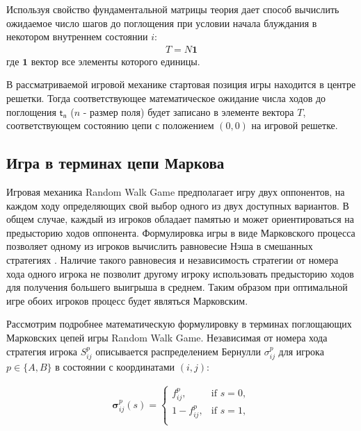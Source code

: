 Используя свойство фундаментальной матрицы теория дает способ вычислить ожидаемое число шагов до поглощения
при условии начала блуждания в некотором внутреннем состоянии $i$:
\begin{equation}
    \begin{aligned}
    T=N\textbf{1}
    \label{eq:T}
    \end{aligned}
\end{equation}
где $\textbf{1}$ вектор все элементы которого единицы.

В рассматриваемой игровой механике стартовая позиция игры находится в центре решетки. 
Тогда соответствующее математическое ожидание числа ходов до поглощения $\boldsymbol{\mathsf{t_n}}$ ($n$ - размер поля) 
будет записано в элементе вектора $T$, соответствующем состоянию цепи с положением $(0, 0)$ на игровой решетке.

\subsection{Игра в терминах цепи Маркова}\label{subsec:ch1/sec3/sub3}

Игровая механика Random Walk Game предполагает игру двух оппонентов, на каждом ходу определяющих свой выбор одного из двух доступных вариантов.
В общем случае, каждый из игроков обладает памятью и может ориентироваться на предысторию ходов оппонента.
Формулировка игры в виде Марковского процесса позволяет одному из игроков вычислить равновесие Нэша в смешанных стратегиях \cite{}.
Наличие такого равновесия и независимость стратегии от номера хода одного игрока не позволит другому игроку использовать предысторию ходов
для получения большего выигрыша в среднем. Таким образом при оптимальной игре обоих игроков процесс будет являться Марковским.

Рассмотрим подробнее математическую формулировку в терминах поглощающих Марковских цепей игры Random Walk Game.
Независимая от номера хода стратегия игрока $S_{ij}^p$ описывается распределением Бернулли $\sigma_{ij}^p$ для игрока 
$p \in \{A, B\}$ в состоянии с координатами $(i, j)$:

\begin{equation}
    \begin{aligned}
    \boldsymbol{\sigma}_{ij}^p(s)=
    \begin{cases}
        f_{ij}^p, &\mbox{if } s = 0,\\ 
        1-f_{ij}^p, &\mbox{if } s = 1,\\
    \end{cases}
    \label{eq:sigma}
    \end{aligned}
\end{equation}


